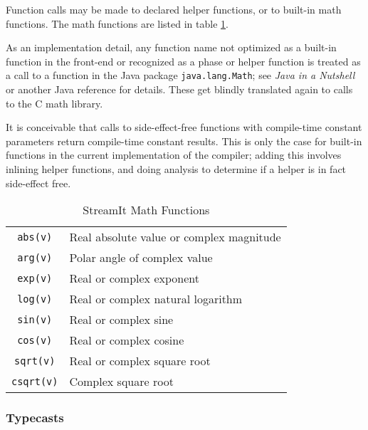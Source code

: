 \documentclass[11pt]{article}
\begin{document}
Function calls may be made to declared helper functions, or to
built-in math functions.  The math functions are listed in table
\ref{tab:math-functions}.

\begin{note}
  As an implementation detail, any function name not optimized as a
  built-in function in the front-end or recognized as a phase or
  helper function is treated as a call to a function in the Java
  package \lstinline|java.lang.Math|; see \emph{Java in a Nutshell} or
  another Java reference for details.  These get blindly translated
  again to calls to the C math library.
\end{note}

\begin{note}
  It is conceivable that calls to side-effect-free functions with
  compile-time constant parameters return compile-time constant
  results.  This is only the case for built-in functions in the
  current implementation of the compiler; adding this involves
  inlining helper functions, and doing analysis to determine if a
  helper is in fact side-effect free.
\end{note}

\begin{table}[htbp]
  \begin{center}
    \begin{tabular}{cl}
      \toprule
      \texttt{abs(v)} & Real absolute value or complex magnitude \\
      \texttt{arg(v)} & Polar angle of complex value \\
      \texttt{exp(v)} & Real or complex exponent \\
      \texttt{log(v)} & Real or complex natural logarithm \\
      \texttt{sin(v)} & Real or complex sine \\
      \texttt{cos(v)} & Real or complex cosine \\
      \texttt{sqrt(v)} & Real or complex square root \\
      \texttt{csqrt(v)} & Complex square root \\
      \bottomrule
    \end{tabular}
    \caption{StreamIt Math Functions}
    \label{tab:math-functions}
  \end{center}
\end{table}

\subsubsection{Typecasts}
\end{document}
